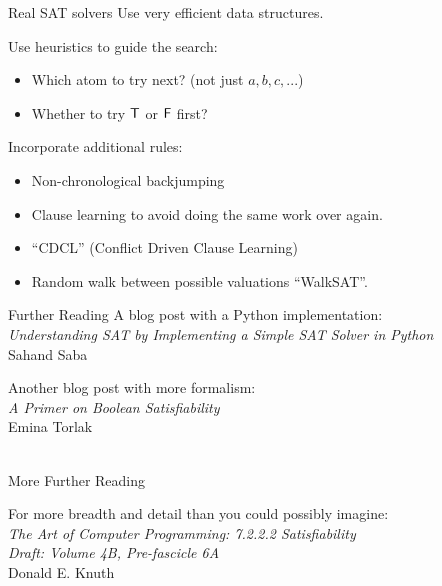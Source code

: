 \documentclass[xetex,aspectratio=169,14pt,hyperref={pdfpagelabels=true,pdflang={en-GB}}]{beamer}
\begin{document}
\begin{frame}[t]
  {Real SAT solvers}
  Use very efficient data structures.

  \medskip

  Use heuristics to guide the search:
  \begin{itemize}
  \item Which atom to try next? (not just $a, b, c, ...$)
  \item Whether to try $\mathsf{T}$ or $\mathsf{F}$ first?
  \end{itemize}

  \bigskip

  Incorporate additional rules:
  \begin{itemize}
  \item Non-chronological backjumping \\
  \item Clause learning to avoid doing the same work over again.
  \item “CDCL” (Conflict Driven Clause Learning)
  \item Random walk between possible valuations “WalkSAT”.
  \end{itemize}
\end{frame}

\begin{frame}[t]
  {Further Reading}
  A blog post with a Python implementation: \\
  \quad \emph{Understanding SAT by Implementing a Simple SAT Solver in Python} \\
  \quad \textcolor{black!60}{Sahand Saba} \\

  \bigskip

  Another blog post with more formalism: \\
  \quad \emph{A Primer on Boolean Satisfiability} \\
  \quad \textcolor{black!60}{Emina Torlak} \\
   \\
\end{frame}

\begin{frame}[t]
  {More Further Reading}

  For more breadth and detail than you could possibly imagine:\\
  \quad \emph{The Art of Computer Programming: 7.2.2.2 Satisfiability} \\
  \qquad \emph{Draft: Volume 4B, Pre-fascicle 6A} \\
  \quad \textcolor{black!60}{Donald E. Knuth} \\
\end{frame}
\end{document}
